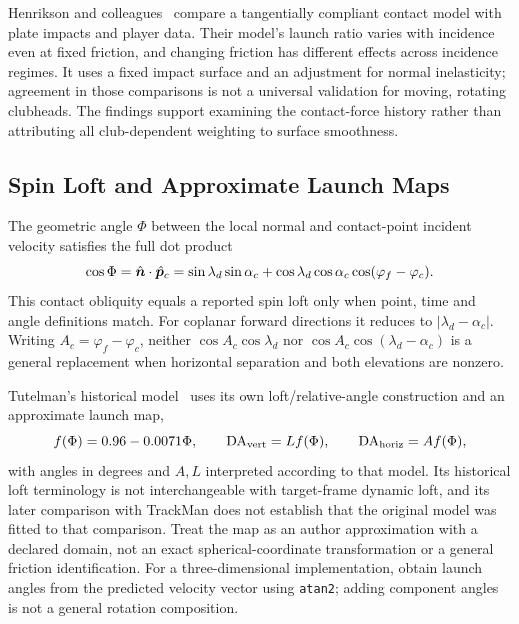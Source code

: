 Henrikson and colleagues~\cite{mdpifriction} compare a tangentially compliant contact model with plate impacts and player data.
Their model's launch ratio varies with incidence even at fixed friction, and changing friction has different effects across incidence regimes.
It uses a fixed impact surface and an adjustment for normal inelasticity; agreement in those comparisons is not a universal validation for moving, rotating clubheads.
The findings support examining the contact-force history rather than attributing all club-dependent weighting to surface smoothness.

\subsection{Spin Loft and Approximate Launch Maps}

The geometric angle $\Phi$ between the local normal and contact-point incident velocity satisfies the full dot product
\begin{equation}
\label{eq:obliqueness}
\cos\Phi=\hat{\bm{n}}\cdot\hat{\bm{p}}_c
 =\sin\lambda_d\sin\alpha_c
  +\cos\lambda_d\cos\alpha_c\cos(\varphi_f-\varphi_c).
\end{equation}
This contact obliquity equals a reported spin loft only when point, time and angle definitions match.
For coplanar forward directions it reduces to $|\lambda_d-\alpha_c|$.
Writing $A_c=\varphi_f-\varphi_c$, neither $\cos A_c\cos\lambda_d$ nor $\cos A_c\cos(\lambda_d-\alpha_c)$ is a general replacement when horizontal separation and both elevations are nonzero.

Tutelman's historical model~\cite{tutelman3d} uses its own loft/relative-angle construction and an approximate launch map,
\begin{equation}
\label{eq:tutelmanlaunch}
f(\Phi)=0.96-0.0071\Phi,\qquad
\mathrm{DA}_{\rm vert}=L f(\Phi),\qquad
\mathrm{DA}_{\rm horiz}=A f(\Phi),
\end{equation}
with angles in degrees and $A,L$ interpreted according to that model.
Its historical loft terminology is not interchangeable with target-frame dynamic loft, and its later comparison with TrackMan does not establish that the original model was fitted to that comparison.
Treat the map as an author approximation with a declared domain, not an exact spherical-coordinate transformation or a general friction identification.
For a three-dimensional implementation, obtain launch angles from the predicted velocity vector using \texttt{atan2}; adding component angles is not a general rotation composition.

